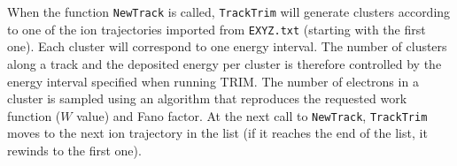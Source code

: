 When the function \texttt{NewTrack} is called, 
\texttt{TrackTrim} will generate clusters according to one of the ion 
trajectories imported from \texttt{EXYZ.txt} (starting with the first one). 
Each cluster will correspond to one energy interval. 
The number of clusters along a track and the deposited energy per cluster 
is therefore controlled by the energy interval specified when running TRIM.
The number of electrons in a cluster is sampled using an algorithm 
that reproduces the requested work function ($W$ value) and Fano factor.
At the next call to \texttt{NewTrack}, \texttt{TrackTrim} moves to the  
next ion trajectory in the list (if it reaches the end of the list, 
it rewinds to the first one). 
